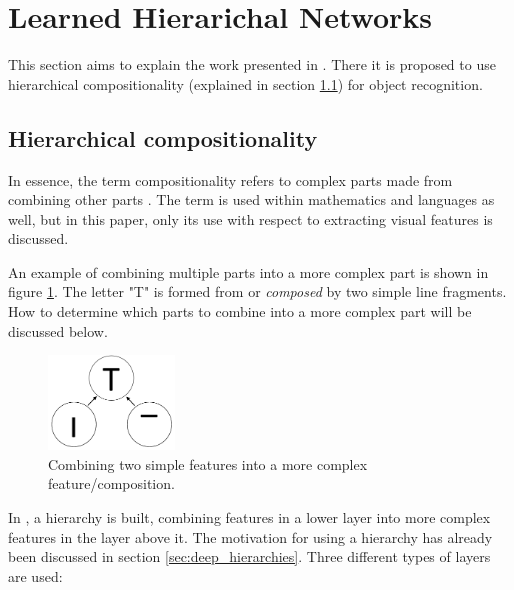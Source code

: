 \section{Learned Hierarichal Networks}
\label{sec:fidler}
This section aims to explain the work presented in \citet{fidler2009learning}. 
There it is proposed to use hierarchical compositionality (explained in section \ref{sec:hierarchical-comp}) for object recognition. 

\subsection{Hierarchical compositionality}
\label{sec:hierarchical-comp}
In essence, the term compositionality refers to complex parts made from combining other parts \citep[p. 2]{fidler2007towards}.
The term is used within mathematics and languages as well, but in this paper,
only its use with respect to extracting visual features is discussed. 

An example of combining multiple parts into a more complex part is shown in figure \ref{fig:compositionality1}. 
The letter "T" is formed from or \textit{composed} by two simple line fragments. 
How to determine which parts to combine into a more complex part will be discussed below.

\begin{figure}[h!] %
\centering
\includegraphics[width=0.3\textwidth]{graphics/compositionality1}
\caption[Compositionality]{Combining two simple features into a more complex feature/composition.}
\label{fig:compositionality1}
\end{figure}

In \citet{fidler2009learning}, a hierarchy is built,
combining features in a lower layer into more complex features in the layer above it. 
The motivation for using a hierarchy has already been discussed in section \ref{sec:deep_hierarchies}. 
Three different types of layers are used: 

